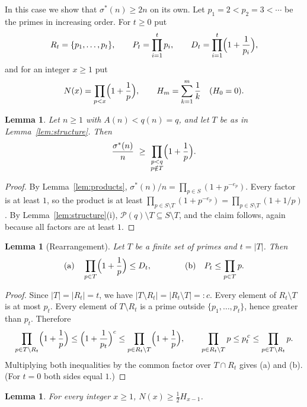 \documentclass[11pt,a4paper]{amsart}
\newtheorem{lemma}[theorem]{Lemma}
\theoremstyle{definition}
\theoremstyle{remark}
\newcommand{\usig}{\sigma^{*}}
\begin{document}
In this case we show that $\usig(n) \ge 2n$ on its own. Let $p_1 = 2 < p_2 = 3 < \cdots$ be the primes in increasing order. For $t\ge 0$ put
\[
  R_t = \{p_1,\dots,p_t\},\qquad P_t = \prod_{i=1}^t p_i, \qquad D_t = \prod_{i=1}^t\Bigl(1+\frac{1}{p_i}\Bigr),
\]
and for an integer $x \ge 1$ put
\[
  N(x) = \prod_{p<x}\Bigl(1+\frac1p\Bigr), \qquad H_m = \sum_{k=1}^m \frac1k \quad (H_0 = 0).
\]

\begin{lemma}\label{lem:usig-lower}
Let $n\ge1$ with $A(n)<q(n)=q$, and let $T$ be as in Lemma~\ref{lem:structure}. Then
\[
  \frac{\usig(n)}{n} \ \ge\ \prod_{\substack{p<q\\ p\notin T}}\Bigl(1+\frac1p\Bigr).
\]
\end{lemma}

\begin{proof}
By Lemma~\ref{lem:products}, $\usig(n)/n = \prod_{p\in S}(1+p^{-e_p})$. Every factor is at least $1$, so the product is at least $\prod_{p\in S\setminus T}(1+p^{-e_p}) = \prod_{p\in S\setminus T}(1+1/p)$. By Lemma~\ref{lem:structure}(i), $\mathcal{P}(q)\setminus T \subseteq S\setminus T$, and the claim follows, again because all factors are at least $1$.
\end{proof}

\begin{lemma}[Rearrangement]\label{lem:rearr}
Let $T$ be a finite set of primes and $t = |T|$. Then
\[
  \text{(a)}\quad \prod_{p\in T}\Bigl(1+\frac1p\Bigr) \le D_t, \qquad\qquad \text{(b)}\quad P_t \le \prod_{p\in T}p .
\]
\end{lemma}

\begin{proof}
Since $|T| = |R_t| = t$, we have $|T\setminus R_t| = |R_t\setminus T| =: c$. Every element of $R_t\setminus T$ is at most $p_t$. Every element of $T\setminus R_t$ is a prime outside $\{p_1,\dots,p_t\}$, hence greater than $p_t$. Therefore
\[
  \prod_{p\in T\setminus R_t}\Bigl(1+\frac1p\Bigr) \le \Bigl(1+\frac1{p_t}\Bigr)^{c} \le \prod_{p\in R_t\setminus T}\Bigl(1+\frac1p\Bigr),
  \qquad
  \prod_{p\in R_t\setminus T}p \le p_t^{\,c} \le \prod_{p\in T\setminus R_t}p .
\]
Multiplying both inequalities by the common factor over $T\cap R_t$ gives (a) and (b). (For $t=0$ both sides equal $1$.)
\end{proof}

\begin{lemma}\label{lem:harmonic}
For every integer $x\ge 1$, $N(x) \ge \tfrac12 H_{x-1}$.
\end{lemma}
\end{document}
